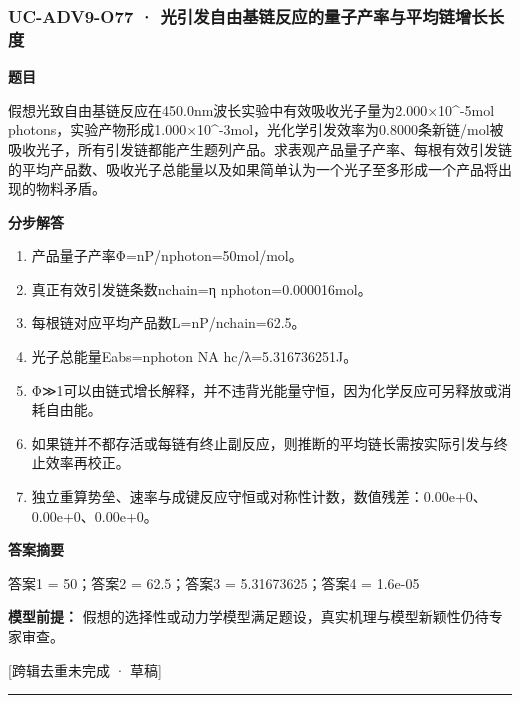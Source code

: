\documentclass[UTF8,11pt,a4paper]{ctexart}
\begin{document}
\subsubsection*{UC-ADV9-O77 · 光引发自由基链反应的量子产率与平均链增长长度}
\noindent\textbf{题目}\par
假想光致自由基链反应在450.0nm波长实验中有效吸收光子量为2.000×10\textasciicircum{}-5mol photons，实验产物形成1.000×10\textasciicircum{}-3mol，光化学引发效率为0.8000条新链/mol被吸收光子，所有引发链都能产生题列产品。求表观产品量子产率、每根有效引发链的平均产品数、吸收光子总能量以及如果简单认为一个光子至多形成一个产品将出现的物料矛盾。\par
\medskip\noindent\textbf{分步解答}
\begin{enumerate}
\item 产品量子产率Φ=nP/nphoton=50mol/mol。
\item 真正有效引发链条数nchain=η nphoton=0.000016mol。
\item 每根链对应平均产品数L=nP/nchain=62.5。
\item 光子总能量Eabs=nphoton NA hc/λ=5.316736251J。
\item Φ≫1可以由链式增长解释，并不违背光能量守恒，因为化学反应可另释放或消耗自由能。
\item 如果链并不都存活或每链有终止副反应，则推断的平均链长需按实际引发与终止效率再校正。
\item 独立重算势垒、速率与成键反应守恒或对称性计数，数值残差：0.00e+0、0.00e+0、0.00e+0。
\end{enumerate}
\noindent\textbf{答案摘要}\par
答案1 = 50；答案2 = 62.5；答案3 = 5.31673625；答案4 = 1.6e-05\par
\noindent\textbf{模型前提：}
假想的选择性或动力学模型满足题设，真实机理与模型新颖性仍待专家审查。\par
\noindent\textcolor{red!65!black}{[跨辑去重未完成 · 草稿]} \par
\medskip\hrule\medskip
{}
\end{document}
